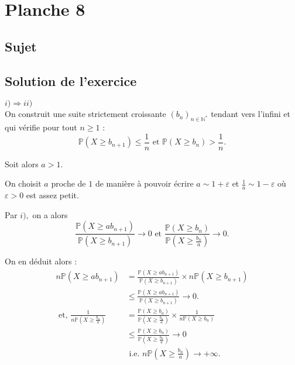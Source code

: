 \chapter{Planche 8}

\section{Sujet}

\section{Solution de l'exercice} %

$\boxed{i)\Longrightarrow ii)}$\\

On construit une suite strictement croissante $\displaystyle (b_{n})_{n\in\mathbb{N}^{*}}$ tendant vers l'infini et qui vérifie pour tout $n\geq 1$ : $$\mathbb{P}(X\geq b_{n+1})\leq \frac{1}{n} \mbox{ et }\mathbb{P}(X\geq b_{n})>\frac{1}{n}.$$

Soit alors $a>1.$ 

On choisit $a$ proche de $1$ de manière à pouvoir écrire $\displaystyle a\sim 1+\varepsilon$ et $\displaystyle \frac{1}{a}\sim 1-\varepsilon$ où $\varepsilon>0$ est assez petit.

Par $i),$ on a alors $$ \frac{\mathbb{P}(X\geq ab_{n+1})}{\mathbb{P}(X\geq b_{n+1})}\longrightarrow 0 \mbox{ et } \frac{\mathbb{P}(X\geq b_{n})}{\mathbb{P}(X\geq \frac{b_{n}}{a})}\longrightarrow 0.$$

On en déduit alors :  
\begin{align*}
n\mathbb{P}(X\geq ab_{n+1}) & = \frac{\mathbb{P}(X\geq ab_{n+1})}{\mathbb{P}(X\geq b_{n+1})}\times n\mathbb{P}(X\geq b_{n+1})\\
& \leq \frac{\mathbb{P}(X\geq ab_{n+1})}{\mathbb{P}(X\geq b_{n+1})} \longrightarrow 0.\\
\mbox{ et, } \frac{1}{n\mathbb{P}(X\geq \frac{b_{n}}{a})} & = \frac{\mathbb{P}(X\geq b_{n})}{\mathbb{P}(X\geq \frac{b_{n}}{a})}\times \frac{1}{n\mathbb{P}(X\geq b_{n})}\\
& \leq \frac{\mathbb{P}(X\geq b_{n})}{\mathbb{P}(X\geq \frac{b_{n}}{a})} \longrightarrow 0\\
& \mbox{ i.e. } n\mathbb{P}(X\geq \frac{b_{n}}{a}) \longrightarrow +\infty.
\end{align*}

